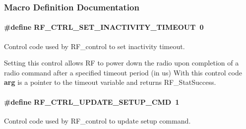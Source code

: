 \subsubsection{Macro Definition Documentation}
\paragraph[{R\+F\+\_\+\+C\+T\+R\+L\+\_\+\+S\+E\+T\+\_\+\+I\+N\+A\+C\+T\+I\+V\+I\+T\+Y\+\_\+\+T\+I\+M\+E\+O\+U\+T}]{\setlength{\rightskip}{0pt plus 5cm}\#define R\+F\+\_\+\+C\+T\+R\+L\+\_\+\+S\+E\+T\+\_\+\+I\+N\+A\+C\+T\+I\+V\+I\+T\+Y\+\_\+\+T\+I\+M\+E\+O\+U\+T~0}\label{group___r_f___c_t_r_l_ga24096530a8da4bde84275bc9c76b2cee}


Control code used by R\+F\+\_\+control to set inactivity timeout. 

Setting this control allows R\+F to power down the radio upon completion of a radio command after a specified timeout period (in us) With this control code {\bfseries arg} is a pointer to the timeout variable and returns R\+F\+\_\+\+Stat\+Success. 
\paragraph[{R\+F\+\_\+\+C\+T\+R\+L\+\_\+\+U\+P\+D\+A\+T\+E\+\_\+\+S\+E\+T\+U\+P\+\_\+\+C\+M\+D}]{\setlength{\rightskip}{0pt plus 5cm}\#define R\+F\+\_\+\+C\+T\+R\+L\+\_\+\+U\+P\+D\+A\+T\+E\+\_\+\+S\+E\+T\+U\+P\+\_\+\+C\+M\+D~1}\label{group___r_f___c_t_r_l_ga74d367afdca187785b17c59b31d1e89a}


Control code used by R\+F\+\_\+control to update setup command. 

